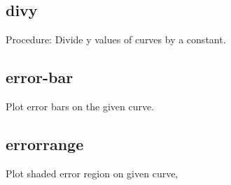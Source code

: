 \documentclass[letterpaper,10pt,english]{sphinxmanual}
\begin{document}
\subsection{divy}
\label{\detokenize{math_operations:divy}}
Procedure: Divide y values of curves by a constant.

\begin{sphinxVerbatim}[commandchars=\\\{\}]
\PYG{p}{[}\PYG{p}{]}   
\end{sphinxVerbatim}


\subsection{error-bar}
\label{\detokenize{math_operations:error-bar}}
Plot error bars on the given curve.

\begin{sphinxVerbatim}[commandchars=\\\{\}]
\PYG{p}{[}\PYG{p}{]}     \PYG{p}{[} \PYG{p}{]} \PYG{p}{[}\PYG{p}{]}
\end{sphinxVerbatim}


\subsection{errorrange}
\label{\detokenize{math_operations:errorrange}}
Plot shaded error region on given curve, 

\begin{sphinxVerbatim}[commandchars=\\\{\}]
\PYG{p}{[}\PYG{p}{]}    
\end{sphinxVerbatim}
\end{document}
